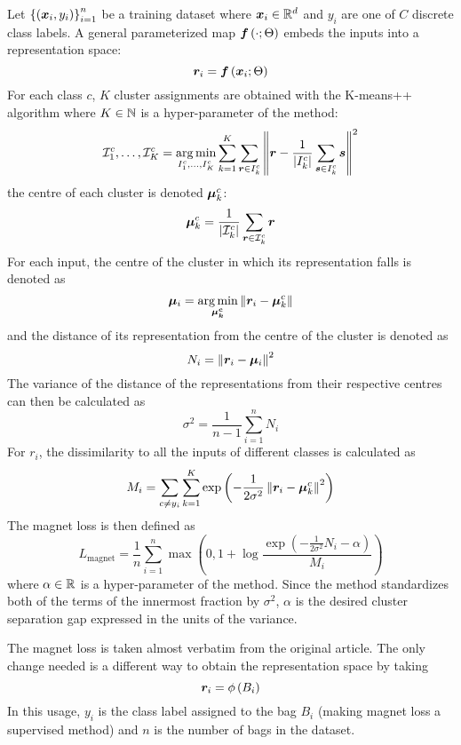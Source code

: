 Let \( \left\{ \left( \bm{x}_i, y_i \right) \right\}_{i = 1}^n \) be a training dataset where \( \bm{x}_i \in \mathbb{R}^d \) and \( y_i \) are one of \( C \) discrete class labels. A general parameterized map \( \bm{f} \left( \cdot; \Theta \right) \) embeds the inputs into a representation space:
\[ \bm{r}_i = \bm{f} \left( \bm{x}_i; \Theta \right) \]
For each class \( c \), \( K \) cluster assignments are obtained with the K-means++ algorithm \cite{macqueen_methods_1967, arthur_k-means++:_2007} where \( K \in \mathbb{N} \) is a hyper-parameter of the method:
\[ \mathcal{I}_1^c, \dots, \mathcal{I}_K^c = \operatorname*{arg\,min}_{I_1^c, \dots, I_K^c} \sum_{k = 1}^K \sum_{\bm{r} \in I_k^c} \left\lVert \bm{r} - \frac{1}{\left\lvert I_k^c \right\rvert} \sum_{\bm{s} \in I_k^c} \bm{s} \right\rVert^2 \]
the centre of each cluster is denoted \( \bm{\mu}_k^c \):
\[ \bm{\mu}_k^c = \frac{1}{\left\lvert \mathcal{I}_k^c \right\rvert} \sum_{\bm{r} \in \mathcal{I}_k^c} \bm{r} \]
For each input, the centre of the cluster in which its representation falls is denoted as
\[ \bm{\mu}_i = \operatorname*{arg\,min}_{\bm{\mu_k^c}} \left\lVert \bm{r}_i - \bm{\mu}_k^c \right\rVert \]
and the distance of its representation from the centre of the cluster is denoted as
\[ N_i = \left\lVert \bm{r}_i - \bm{\mu}_i \right\rVert^2 \]
The variance of the distance of the representations from their respective centres can then be calculated as
\[ \sigma^2 = \frac{1}{n - 1} \sum_{i = 1}^n N_i \]
For \( r_i \), the dissimilarity to all the inputs of different classes is calculated as
\[ M_i = \sum_{c \neq y_i} \sum_{k = 1}^K \exp \left( - \frac{1}{2 \sigma^2} \left\lVert \bm{r}_i - \bm{\mu}_k^c \right\rVert^2 \right) \]
The magnet loss is then defined as
\[ L_\mathrm{magnet} = \frac{1}{n} \sum_{i = 1}^n \max \left( 0, 1 + \log \frac{\exp \left( - \frac{1}{2 \sigma^2} N_i - \alpha \right)}{M_i} \right) \]
where \( \alpha \in \mathbb{R} \) is a hyper-parameter of the method. Since the method standardizes both of the terms of the innermost fraction by \( \sigma^2 \), \( \alpha \) is the desired cluster separation gap expressed in the units of the variance.

The magnet loss is taken almost verbatim from the original article. The only change needed is a different way to obtain the representation space by taking
\[ \bm{r}_i = \phi \left( B_i \right) \]
In this usage, \( y_i \) is the class label assigned to the bag \( B_i \) (making magnet loss a supervised method) and \( n \) is the number of bags in the dataset.

